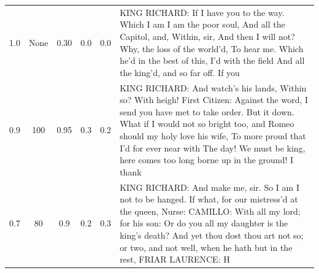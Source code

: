 \documentclass[11pt]{book}
\newcommand{\clearemptydoublepage}{\newpage{\pagestyle{empty}\cleardoublepage}}
\begin{document}
\begin{longtable}{ccccc p{12cm}}
    1.0 & None & 0.30 & 0.0 & 0.0 &
    KING RICHARD:\newline
    If I have you to the way.\newline
    Which I am I am the poor soul,\newline
    And all the Capitol, and,\newline
    Within, sir,\newline
    And then I will not?\newline
    Why, the loss of the world'd,\newline
    To hear me.\newline
    Which he'd in the best of this,\newline
    I'd with the field\newline
    And all the king'd, and so far off.\newline
    If you\\
    
    0.9 & 100 & 0.95 & 0.3 & 0.2 &
    KING RICHARD:\newline
    And watch's his lands,\newline
    Within so?\newline
    With heigh!\newline
    First Citizen:\newline
    Against the word, I send you have met to take order.\newline
    But it down.\newline
    What if I would not so bright too, and Romeo should my holy love his wife,\newline
    To more proud that I'd for ever near with\newline
    The day! We must be king, here comes too long borne up in the ground!\newline
    I thank\\
    
    0.7 & 80 & 0.9 & 0.2 & 0.3 &
    KING RICHARD:\newline
    And make me, sir.\newline
    So I am I not to be hanged.\newline
    If what, for our mistress'd at the queen,\newline
    Nurse:\newline
    CAMILLO:\newline
    With all my lord; for his son:\newline
    Or do you all my daughter is the king's death?\newline
    And yet thou dost thou art not so; or two, and not well, when he hath but in the rest,\newline
    FRIAR LAURENCE:\newline
    H\\
    
    \end{longtable}
    


\clearemptydoublepage
\end{document}
